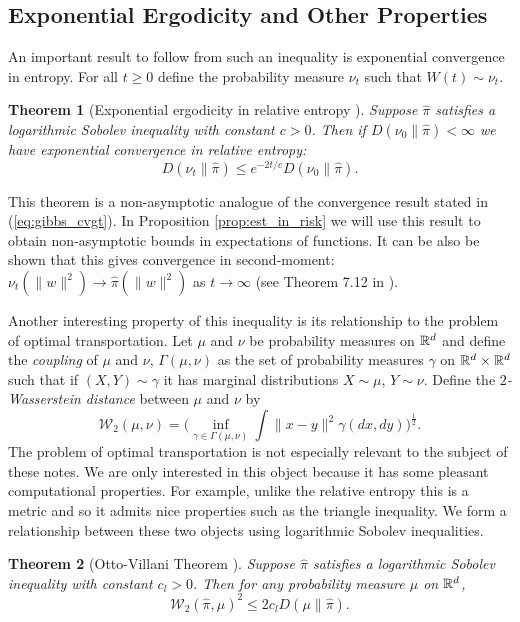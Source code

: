 \documentclass{article}
\newtheorem{theorem}{Theorem}[section]
\newcommand{\Bcal}[1]{\mathcal{#1}}
\begin{document}
\subsection{Exponential Ergodicity and Other Properties}
An important result to follow from such an inequality is exponential convergence in entropy. For all \(t \geq 0\) define the probability measure \(\nu_t\) such that \(W(t) \sim \nu_t\).
\begin{theorem}[Exponential ergodicity in relative entropy \cite{Bakry2014AnalysisOperators}]\label{thm:exp_erg}
Suppose \(\hat{\pi}\) satisfies a logarithmic Sobolev inequality with constant \(c > 0\). Then if \(D(\nu_0 \| \hat{\pi}) < \infty\) we have exponential convergence in relative entropy: 
\begin{equation*}
    D(\nu_t \| \hat{\pi}) \leq e^{-2t/c} D(\nu_0 \| \hat{\pi}).
\end{equation*}
\end{theorem}
This theorem is a non-asymptotic analogue of the convergence result stated in (\ref{eq:gibbs_cvgt}). In Proposition \ref{prop:est_in_risk} we will use this result to obtain non-asymptotic bounds in expectations of functions. It can be also be shown that this gives convergence in second-moment: \(\nu_t(\|w\|^2) \to \hat{\pi}(\|w\|^2)\) as \(t \to \infty\) (see Theorem 7.12 in \cite{Villani2003TopicsTransportation}).

Another interesting property of this inequality is its relationship to the problem of optimal transportation. Let \(\mu\) and \(\nu\) be probability measures on \(\Bbb{R}^d\) and define the \textit{coupling} of \(\mu\) and \(\nu\), \(\Gamma(\mu, \nu)\) as the set of probability measures \(\gamma\) on \(\Bbb{R}^d \times \Bbb{R}^d\) such that if \((X, Y) \sim \gamma\) it has marginal distributions \(X \sim \mu\), \(Y \sim \nu\). Define the \textit{\(2\)-Wasserstein distance} between \(\mu\) and \(\nu\) by
\begin{equation*}
    \Bcal{W}_2(\mu, \nu) = \bigg ( \inf_{\gamma \in \Gamma(\mu, \nu)} \int \|x - y\|^2 \gamma(dx, dy) \bigg )^\frac{1}{2}.
\end{equation*}
The problem of optimal transportation is not especially relevant to the subject of these notes. We are only interested in this object because it has some pleasant computational properties. For example, unlike the relative entropy this is a metric and so it admits nice properties such as the triangle inequality. We form a relationship between these two objects using logarithmic Sobolev inequalities.
\begin{theorem}[Otto-Villani Theorem \cite{Bakry2014AnalysisOperators}]\label{thm:otto_villani}
Suppose \(\hat{\pi}\) satisfies a logarithmic Sobolev inequality with constant \(c_l > 0\). Then for any probability measure \(\mu\) on \(\Bbb{R}^d\),
\begin{equation*}
    \Bcal{W}_2(\hat{\pi}, \mu)^2 \leq 2 c_l D(\mu \| \hat{\pi}).
\end{equation*}
\end{theorem}
\end{document}
